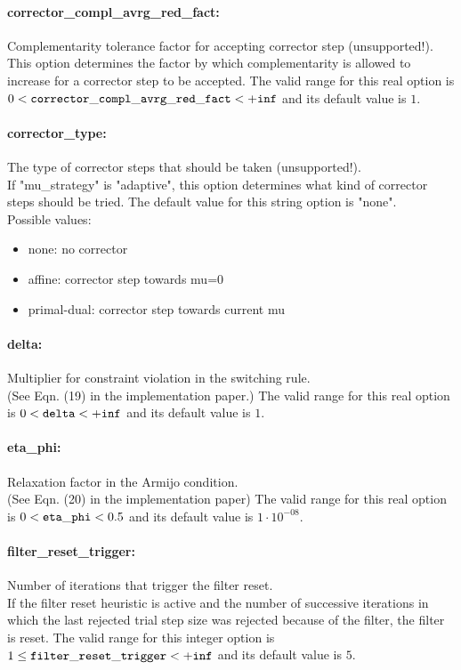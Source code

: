 \paragraph{corrector\_compl\_avrg\_red\_fact:}\label{opt:corrector_compl_avrg_red_fact} Complementarity tolerance factor for accepting corrector step (unsupported!). \\
 This option determines the factor by which complementarity is allowed to increase for a corrector step to be accepted. The valid range for this real option is 
$0 <  {\tt corrector\_compl\_avrg\_red\_fact } <  {\tt +inf}$
and its default value is $1$.


\paragraph{corrector\_type:}\label{opt:corrector_type} The type of corrector steps that should be taken (unsupported!). \\
 If "mu\_strategy" is "adaptive", this option determines what kind of corrector steps should be tried. The default value for this string option is "none".
\\ 
Possible values:
\begin{itemize}
   \item none: no corrector
   \item affine: corrector step towards mu=0
   \item primal-dual: corrector step towards current mu
\end{itemize}

\paragraph{delta:}\label{opt:delta} Multiplier for constraint violation in the switching rule. \\
 (See Eqn. (19) in the implementation paper.) The valid range for this real option is 
$0 <  {\tt delta } <  {\tt +inf}$
and its default value is $1$.


\paragraph{eta\_phi:}\label{opt:eta_phi} Relaxation factor in the Armijo condition. \\
 (See Eqn. (20) in the implementation paper) The valid range for this real option is 
$0 <  {\tt eta\_phi } <  0.5$
and its default value is $1 \cdot 10^{-08}$.


\paragraph{filter\_reset\_trigger:}\label{opt:filter_reset_trigger} Number of iterations that trigger the filter reset. \\
 If the filter reset heuristic is active and the number of successive iterations in which the last rejected trial step size was rejected because of the filter, the filter is reset. The valid range for this integer option is
$1 \le {\tt filter\_reset\_trigger } <  {\tt +inf}$
and its default value is $5$.


